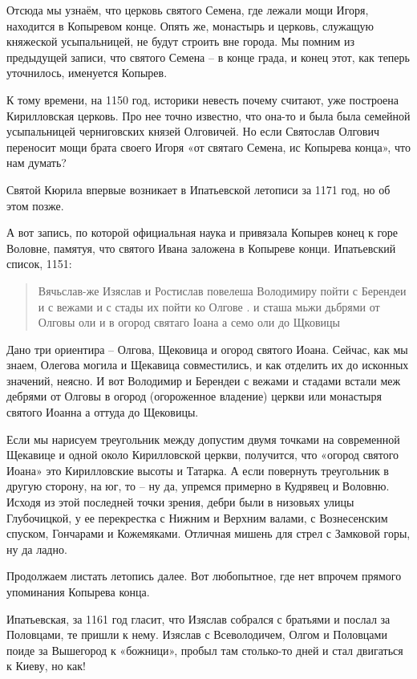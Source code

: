 Отсюда мы узнаём, что церковь святого Семена, где лежали мощи Игоря, находится в Копыревом конце. Опять же, монастырь и церковь, служащую княжеской усыпальницей, не будут строить вне города. Мы помним из предыдущей записи, что святого Семена – в конце града, и конец этот, как теперь уточнилось, именуется Копырев.

К тому времени, на 1150 год, историки невесть почему считают, уже построена Кирилловская церковь. Про нее точно известно, что она-то и была была семейной усыпальницей черниговских князей Олговичей. Но если Святослав Олгович переносит мощи брата своего Игоря «от святаго Семена, ис Копырева конца», что нам думать?

Святой Кюрила впервые возникает в Ипатьевской летописи за 1171 год, но об этом позже.

А вот запись, по которой официальная наука и привязала Копырев конец к горе Воловне, памятуя, что святого Ивана заложена в Копыреве конци. Ипатьевский список, 1151:

\begin{quotation}
Вячьслав-же Изяслав и Ростислав повелеша Володимиру пойти с Берендеи и с вежами и с стады их пойти ко Олгове . и сташа мьжи дьбрями от Олговы оли и в огород святаго Іоана а семо оли до Щковицы
\end{quotation}

Дано три ориентира – Олгова, Щековица и огород святого Иоана. Сейчас, как мы знаем, Олегова могила и Щекавица совместились, и как отделить их до исконных значений, неясно. И вот Володимир и Берендеи с вежами и стадами встали меж дебрями от Олговы в огород (огороженное владение) церкви или монастыря святого Иоанна а оттуда до Щековицы.

Если мы нарисуем треугольник между допустим двумя точками на современной Щекавице и одной около Кирилловской церкви, получится, что «огород святого Иоана» это Кирилловские высоты и Татарка. А если повернуть треугольник в другую сторону, на юг, то – ну да, упремся примерно в Кудрявец и Воловню. Исходя из этой последней точки зрения, дебри были в низовьях улицы Глубочицкой, у ее перекрестка с Нижним и Верхним валами, с Вознесенским спуском, Гончарами и Кожемяками. Отличная мишень для стрел с Замковой горы, ну да ладно.

Продолжаем листать летопись далее. Вот любопытное, где нет впрочем прямого упоминания Копырева конца. 

Ипатьевская, за 1161 год гласит, что Изяслав собрался с братьями и послал за Половцами, те пришли к нему. Изяслав с Всеволодичем, Олгом и Половцами поиде за Вышегород к «божници», пробыл там столько-то дней и стал двигаться к Киеву, но как!

